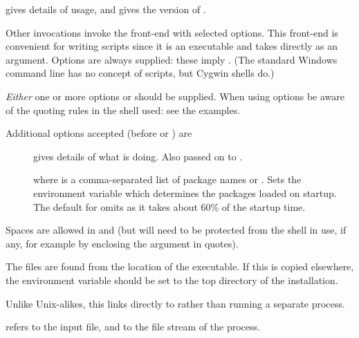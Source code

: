 %
\begin{Details}\relax
{} gives details of usage, and
 gives the version of .

Other invocations invoke the \R{} front-end with selected options.  This
front-end is convenient for writing \samp{\#!} scripts since it is an
executable and takes  directly as an argument.  Options
 are always supplied: these imply
.  (The standard Windows command line has no concept
of \samp{\#!} scripts, but Cygwin shells do.)

\emph{Either} one or more  options or  should
be supplied.  When using  options be aware of the quoting
rules in the shell used: see the examples.

Additional options accepted (before  or ) are
\begin{description}

\item[] gives details of what  is
doing.  Also passed on to \R{}.
\item[] where  is a
comma-separated list of package names or .  Sets the
environment variable  which determines the
packages loaded on startup.  The default for 
omits  as it takes about 60\% of the startup time.


\end{description}


Spaces are allowed in  and  (but will need
to be protected from the shell in use, if any, for example by
enclosing the argument in quotes).

The \R{} files are found from the location of the 
executable.   If this is copied elsewhere, the environment variable
 should be set to the top directory of the \R{} installation.

Unlike Unix-alikes, this links directly to  rather than
running a separate process.

 refers to the input file, and
 to the  file stream of the
process.
\end{Details}
%
